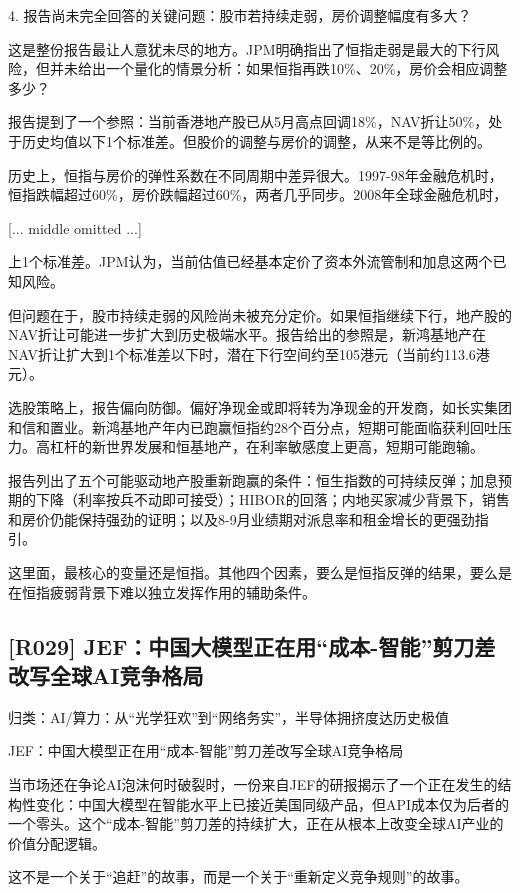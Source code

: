 \documentclass[11pt]{ctexart}
\begin{document}
4. 报告尚未完全回答的关键问题：股市若持续走弱，房价调整幅度有多大？

这是整份报告最让人意犹未尽的地方。JPM明确指出了恒指走弱是最大的下行风险，但并未给出一个量化的情景分析：如果恒指再跌10\%、20\%，房价会相应调整多少？

报告提到了一个参照：当前香港地产股已从5月高点回调18\%，NAV折让50\%，处于历史均值以下1个标准差。但股价的调整与房价的调整，从来不是等比例的。

历史上，恒指与房价的弹性系数在不同周期中差异很大。1997-98年金融危机时，恒指跌幅超过60\%，房价跌幅超过60\%，两者几乎同步。2008年全球金融危机时，

[... middle omitted ...]

上1个标准差。JPM认为，当前估值已经基本定价了资本外流管制和加息这两个已知风险。

但问题在于，股市持续走弱的风险尚未被充分定价。如果恒指继续下行，地产股的NAV折让可能进一步扩大到历史极端水平。报告给出的参照是，新鸿基地产在NAV折让扩大到1个标准差以下时，潜在下行空间约至105港元（当前约113.6港元）。

选股策略上，报告偏向防御。偏好净现金或即将转为净现金的开发商，如长实集团和信和置业。新鸿基地产年内已跑赢恒指约28个百分点，短期可能面临获利回吐压力。高杠杆的新世界发展和恒基地产，在利率敏感度上更高，短期可能跑输。

报告列出了五个可能驱动地产股重新跑赢的条件：恒生指数的可持续反弹；加息预期的下降（利率按兵不动即可接受）；HIBOR的回落；内地买家减少背景下，销售和房价仍能保持强劲的证明；以及8-9月业绩期对派息率和租金增长的更强劲指引。

这里面，最核心的变量还是恒指。其他四个因素，要么是恒指反弹的结果，要么是在恒指疲弱背景下难以独立发挥作用的辅助条件。

\subsection{[R029] JEF：中国大模型正在用“成本-智能”剪刀差改写全球AI竞争格局}
{\small\color{refgray}归类：AI/算力：从“光学狂欢”到“网络务实”，半导体拥挤度达历史极值}

JEF：中国大模型正在用“成本-智能”剪刀差改写全球AI竞争格局

当市场还在争论AI泡沫何时破裂时，一份来自JEF的研报揭示了一个正在发生的结构性变化：中国大模型在智能水平上已接近美国同级产品，但API成本仅为后者的一个零头。这个“成本-智能”剪刀差的持续扩大，正在从根本上改变全球AI产业的价值分配逻辑。

这不是一个关于“追赶”的故事，而是一个关于“重新定义竞争规则”的故事。
\end{document}
